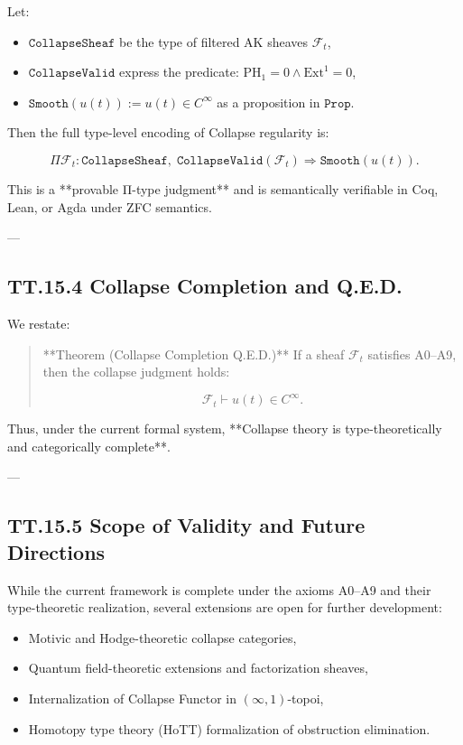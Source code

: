 \documentclass[11pt]{article}
\begin{document}
{Let:

\begin{itemize}
  \item $\texttt{CollapseSheaf}$ be the type of filtered AK sheaves $\mathcal{F}_t$,
  \item $\texttt{CollapseValid}$ express the predicate: $\mathrm{PH}_1 = 0 \wedge \mathrm{Ext}^1 = 0$,
  \item $\texttt{Smooth}(u(t)) := u(t) \in C^\infty$ as a proposition in $\texttt{Prop}$.
\end{itemize}

Then the full type-level encoding of Collapse regularity is:

\[
\Pi \mathcal{F}_t : \texttt{CollapseSheaf},\;
\texttt{CollapseValid}(\mathcal{F}_t)
\Rightarrow \texttt{Smooth}(u(t)).
\]

This is a **provable Π-type judgment** and is semantically verifiable in Coq, Lean, or Agda under ZFC semantics.

---

\subsection*{TT.15.4 Collapse Completion and Q.E.D.}

We restate:

\begin{quote}
**Theorem (Collapse Completion Q.E.D.)**  
If a sheaf $\mathcal{F}_t$ satisfies A0–A9, then the collapse judgment holds:

\[
\mathcal{F}_t \vdash u(t) \in C^\infty.
\]
\end{quote}

Thus, under the current formal system, **Collapse theory is type-theoretically and categorically complete**.

---

\subsection*{TT.15.5 Scope of Validity and Future Directions}

While the current framework is complete under the axioms A0–A9 and their type-theoretic realization,  
several extensions are open for further development:

\begin{itemize}
  \item Motivic and Hodge-theoretic collapse categories,
  \item Quantum field-theoretic extensions and factorization sheaves,
  \item Internalization of Collapse Functor in $(\infty,1)$-topoi,
  \item Homotopy type theory (HoTT) formalization of obstruction elimination.
\end{itemize}

}
\end{document}
